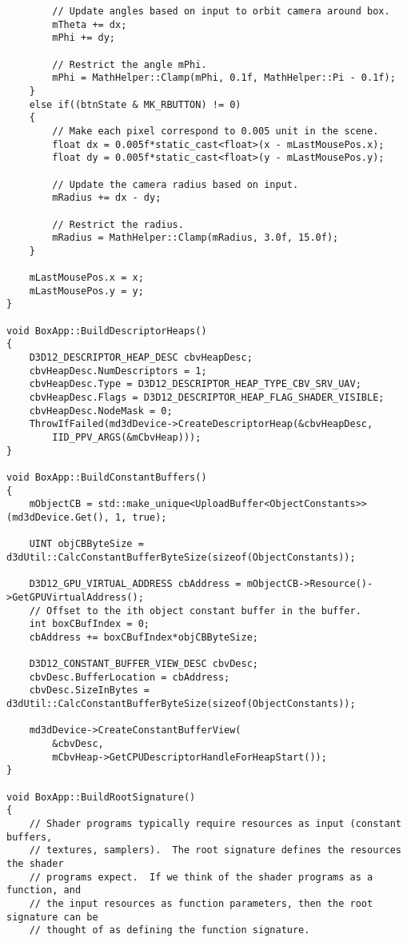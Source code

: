 \begin{lstlisting}
        // Update angles based on input to orbit camera around box.
        mTheta += dx;
        mPhi += dy;

        // Restrict the angle mPhi.
        mPhi = MathHelper::Clamp(mPhi, 0.1f, MathHelper::Pi - 0.1f);
    }
    else if((btnState & MK_RBUTTON) != 0)
    {
        // Make each pixel correspond to 0.005 unit in the scene.
        float dx = 0.005f*static_cast<float>(x - mLastMousePos.x);
        float dy = 0.005f*static_cast<float>(y - mLastMousePos.y);

        // Update the camera radius based on input.
        mRadius += dx - dy;

        // Restrict the radius.
        mRadius = MathHelper::Clamp(mRadius, 3.0f, 15.0f);
    }

    mLastMousePos.x = x;
    mLastMousePos.y = y;
}

void BoxApp::BuildDescriptorHeaps()
{
    D3D12_DESCRIPTOR_HEAP_DESC cbvHeapDesc;
    cbvHeapDesc.NumDescriptors = 1;
    cbvHeapDesc.Type = D3D12_DESCRIPTOR_HEAP_TYPE_CBV_SRV_UAV;
    cbvHeapDesc.Flags = D3D12_DESCRIPTOR_HEAP_FLAG_SHADER_VISIBLE;
    cbvHeapDesc.NodeMask = 0;
    ThrowIfFailed(md3dDevice->CreateDescriptorHeap(&cbvHeapDesc,
        IID_PPV_ARGS(&mCbvHeap)));
}

void BoxApp::BuildConstantBuffers()
{
    mObjectCB = std::make_unique<UploadBuffer<ObjectConstants>>(md3dDevice.Get(), 1, true);

    UINT objCBByteSize = d3dUtil::CalcConstantBufferByteSize(sizeof(ObjectConstants));

    D3D12_GPU_VIRTUAL_ADDRESS cbAddress = mObjectCB->Resource()->GetGPUVirtualAddress();
    // Offset to the ith object constant buffer in the buffer.
    int boxCBufIndex = 0;
    cbAddress += boxCBufIndex*objCBByteSize;

    D3D12_CONSTANT_BUFFER_VIEW_DESC cbvDesc;
    cbvDesc.BufferLocation = cbAddress;
    cbvDesc.SizeInBytes = d3dUtil::CalcConstantBufferByteSize(sizeof(ObjectConstants));

    md3dDevice->CreateConstantBufferView(
        &cbvDesc,
        mCbvHeap->GetCPUDescriptorHandleForHeapStart());
}

void BoxApp::BuildRootSignature()
{
    // Shader programs typically require resources as input (constant buffers,
    // textures, samplers).  The root signature defines the resources the shader
    // programs expect.  If we think of the shader programs as a function, and
    // the input resources as function parameters, then the root signature can be
    // thought of as defining the function signature.  


\end{lstlisting}
